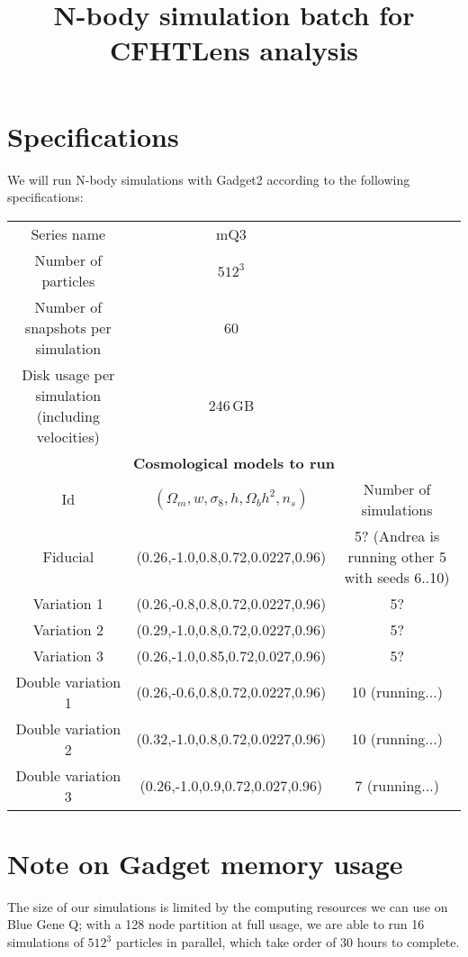 \documentclass[11pt]{article}
\begin{document}
\title{N-body simulation batch for CFHTLens analysis}
\author{}
\date{}

\maketitle

\section*{Specifications}

We will run N-body simulations with Gadget2 according to the following specifications:

\begin{table}[h!]
\begin{center}
\begin{tabular}{ccc} \hline
Series name & mQ3 & \\
Number of particles & $512^3$ & \\ 
Number of snapshots per simulation & 60 & \\
Disk usage per simulation (including velocities) & 246\,GB& \\ \hline
\multicolumn{3}{c}{\textbf{Cosmological models to run}} \\
Id & $(\Omega_m,w,\sigma_8,h,\Omega_bh^2,n_s)$ & Number of simulations\\ \hline
Fiducial & (0.26,-1.0,0.8,0.72,0.0227,0.96) & 5? (Andrea is running other 5 with seeds 6..10) \\
Variation 1 & (0.26,-0.8,0.8,0.72,0.0227,0.96) & 5? \\
Variation 2 & (0.29,-1.0,0.8,0.72,0.0227,0.96) & 5? \\
Variation 3 & (0.26,-1.0,0.85,0.72,0.027,0.96) & 5? \\ \hline
Double variation 1 & (0.26,-0.6,0.8,0.72,0.0227,0.96) & 10 (running...) \\
Double variation 2 & (0.32,-1.0,0.8,0.72,0.0227,0.96) & 10 (running...) \\
Double variation 3 & (0.26,-1.0,0.9,0.72,0.027,0.96) & 7 (running...) \\ \hline
\end{tabular}
\end{center}
\end{table}

\section*{Note on Gadget memory usage}
The size of our simulations is limited by the computing resources we can use on Blue Gene Q; with a 128 node partition at full usage, we are able to run 16 simulations of $512^3$ particles in parallel, which take order of 30 hours to complete. 
\end{document}
